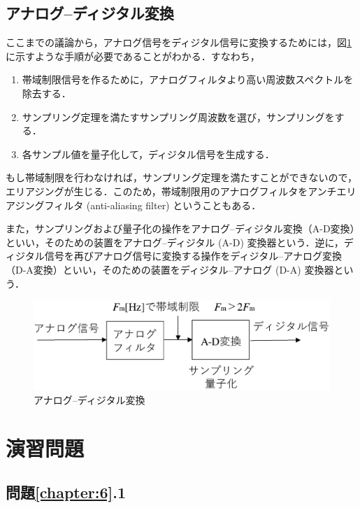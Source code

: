 \subsection{アナログ--ディジタル変換}

ここまでの議論から，アナログ信号をディジタル信号に変換するためには，図\ref{fig:zu-4-20}に示すような手順が必要であることがわかる．すなわち，
\begin{enumerate}
\item 帯域制限信号を作るために，アナログフィルタより高い周波数スペクトルを除去する．
\item サンプリング定理を満たすサンプリング周波数を選び，サンプリングをする．
\item 各サンプル値を量子化して，ディジタル信号を生成する．
\end{enumerate}

もし帯域制限を行わなければ，サンプリング定理を満たすことができないので，エリアジングが生じる．このため，帯域制限用のアナログフィルタをアンチエリアジングフィルタ (anti-aliasing filter) ということもある．

また，サンプリングおよび量子化の操作をアナログ--ディジタル変換（A-D変換）といい，そのための装置をアナログ--ディジタル (A-D) 変換器という．逆に，ディジタル信号を再びアナログ信号に変換する操作をディジタル--アナログ変換（D-A変換）といい，そのための装置をディジタル--アナログ (D-A) 変換器という．

\begin{figure}[H]
\begin{center}
\includegraphics[width=.7\textwidth]{fig/ad-henkan.eps}
\caption{アナログ--ディジタル変換}
\label{fig:zu-4-20}
\end{center}
\end{figure}

\vspace{-\baselineskip}

\section*{演習問題}

\subsection*{問題\ref{chapter:6}.1}

